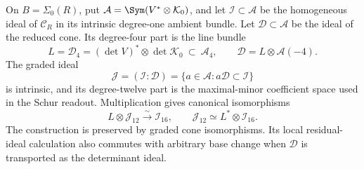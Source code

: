 \begin{lemma}
\label{lem:intrinsic-residual-ideal}
On \(B=\Sigma_0(R)\), put
\(\mathcal A=\Sym(V^*\otimes\mathcal K_0)\), and let
\(\mathcal I\subset\mathcal A\) be the homogeneous ideal of
\(\mathscr C_R\) in its intrinsic degree-one ambient bundle.
Let \(\mathcal D\subset\mathcal A\) be the ideal of the reduced
cone.  Its degree-four part is the line bundle
\begin{equation}\label{eq:determinant-line-bundle}
 L=\mathcal D_4=(\det V)^*\otimes\det\mathcal K_0
                  \ \subset\ \mathcal A_4,
 \qquad \mathcal D=L\otimes\mathcal A(-4).
\end{equation}
The graded ideal
\begin{equation}\label{eq:intrinsic-colon-readout}
 \mathcal J=(\mathcal I:\mathcal D)
   =\{a\in\mathcal A:a\mathcal D\subset\mathcal I\}
\end{equation}
is intrinsic, and its degree-twelve part is the maximal-minor
coefficient space used in the Schur readout.  Multiplication gives
canonical isomorphisms
\begin{equation}\label{eq:twisted-residual-piece}
 L\otimes\mathcal J_{12}\xrightarrow{\sim}\mathcal I_{16},
 \qquad \mathcal J_{12}\simeq L^*\otimes\mathcal I_{16}.
\end{equation}
The construction is preserved by graded cone isomorphisms.  Its
local residual-ideal calculation also commutes with arbitrary base
change when \(\mathcal D\) is transported as the determinant ideal.
\end{lemma}
